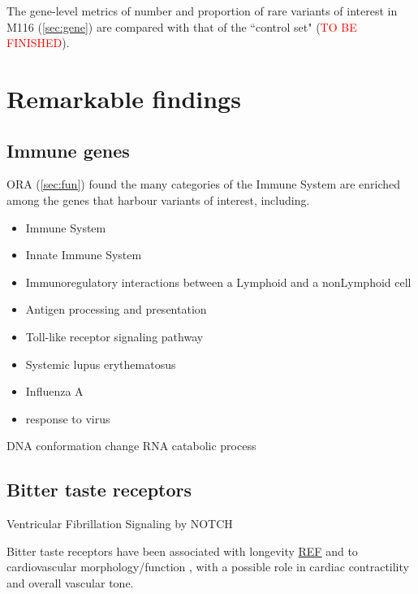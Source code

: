 \documentclass{article}\usepackage[]{graphicx}\usepackage[dvipsnames]{xcolor}
\begin{document}
The gene-level metrics of number and proportion of rare variants of interest in M116 (\autoref{sec:gene}) are compared with that of the ``control set"  (\textcolor{red}{TO BE FINISHED}).







\section{Remarkable findings}

\subsection{Immune genes}


ORA (\autoref{sec:fun}) found the many categories of the Immune System are enriched among the genes that harbour variants of interest, including.

\begin{itemize}
\item Immune System
\item Innate Immune System
\item Immunoregulatory interactions between a Lymphoid and a non\-Lymphoid cell
\item Antigen processing and presentation
\item Toll-like receptor signaling pathway
\item Systemic lupus erythematosus
\item Influenza A
\item response to virus
\end{itemize}



DNA conformation change
RNA catabolic process


\subsection{Bitter taste receptors}

Ventricular Fibrillation
Signaling by NOTCH

Bitter taste receptors have been associated with longevity \href{REF}{REF} and to cardiovascular morphology/function \cite{bloxham2020bitter}\cite{bloxham2024cardiac}, with a possible role in cardiac contractility and overall vascular tone.
\end{document}
